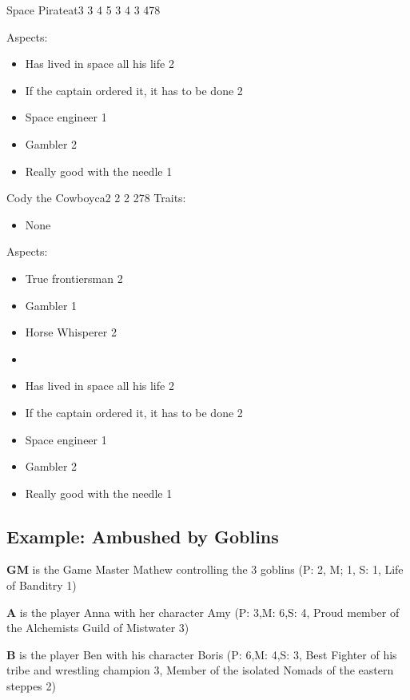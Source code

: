 \documentclass[11pt]{article}
\begin{document}
{\begin{npc}{Space Pirate}{at}{3 3 4 5 3 4 3 4}{78}
\columnbreak

Aspects:
\begin{itemize}
\item Has lived in space all his life 2
\item If the captain ordered it, it has to be done 2
\item Space engineer 1
\item Gambler 2
\item Really good with the needle 1
\end{itemize}
\end{npc}


\begin{npc}{Cody the Cowboy}{ca}{2 2 2 2}{78}
Traits:
\begin{itemize}
\item None
\end{itemize}

\columnbreak

Aspects:
\begin{itemize}
\item True frontiersman 2
\item Gambler 1
\item Horse Whisperer 2
\item 

\item Has lived in space all his life 2
\item If the captain ordered it, it has to be done 2
\item Space engineer 1
\item Gambler 2
\item Really good with the needle 1
\end{itemize}
\end{npc}


\subsection{Example: Ambushed by Goblins}
\label{sec:orgabb0fc1}

\textbf{GM} is the Game Master Mathew controlling the 3 goblins (P: 2, M; 1, S: 1, Life of Banditry 1)

\textbf{A} is the player Anna with her character Amy (P: 3,M: 6,S: 4, Proud member of the Alchemists Guild of Mistwater 3)

\textbf{B} is the player Ben with his character Boris (P: 6,M: 4,S: 3, Best Fighter of his tribe and wrestling champion 3, Member of the isolated Nomads of the eastern steppes 2)

}
\end{document}
